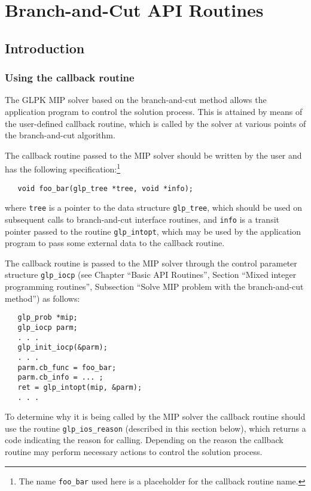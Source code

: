 
\chapter{Branch-and-Cut API Routines}

\section{Introduction}

\subsection{Using the callback routine}

The GLPK MIP solver based on the branch-and-cut method allows the
application program to control the solution process. This is attained
by means of the user-defined callback routine, which is called by the
solver at various points of the branch-and-cut algorithm.

The callback routine passed to the MIP solver should be written by the
user and has the following specification:\footnote{The name
{\tt foo\_bar} used here is a placeholder for the callback routine
name.}

\begin{verbatim}
   void foo_bar(glp_tree *tree, void *info);
\end{verbatim}

\noindent
where \verb|tree| is a pointer to the data structure \verb|glp_tree|,
which should be used on subsequent calls to branch-and-cut interface
routines, and \verb|info| is a transit pointer passed to the routine
\verb|glp_intopt|, which may be used by the application program to pass
some external data to the callback routine.

The callback routine is passed to the MIP solver through the control
parameter structure \verb|glp_iocp| (see Chapter ``Basic API Routines'',
Section ``Mixed integer programming routines'', Subsection ``Solve MIP
problem with the branch-and-cut method'') as follows:

\newpage

\begin{verbatim}
   glp_prob *mip;
   glp_iocp parm;
   . . .
   glp_init_iocp(&parm);
   . . .
   parm.cb_func = foo_bar;
   parm.cb_info = ... ;
   ret = glp_intopt(mip, &parm);
   . . .
\end{verbatim}

To determine why it is being called by the MIP solver the callback
routine should use the routine \verb|glp_ios_reason| (described in this
section below), which returns a code indicating the reason for calling.
Depending on the reason the callback routine may perform necessary
actions to control the solution process.


